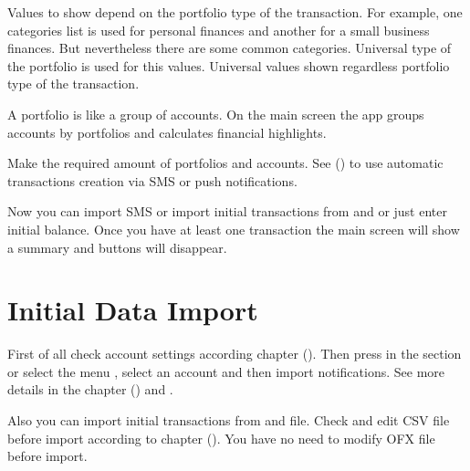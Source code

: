 \documentclass[a4paper,10pt,english]{sphinxmanual}
\begin{document}
Values to show depend on the portfolio type of the transaction.  For example,
one categories list is used for personal finances and another for a small business finances.
But nevertheless there are some common categories. Universal type of the portfolio is used
for this values. Universal values shown regardless portfolio type of the transaction.

A portfolio is like a group of accounts. On the main screen the app groups accounts by portfolios and
calculates financial highlights.

Make the required amount of portfolios and accounts. See {\hyperref[\detokenize{account-identities:chapter-account-identities}]{}} () to use automatic transactions creation
via SMS or push notifications.

Now you can import SMS or import initial transactions from  and  or just enter initial balance.
Once you have at least one transaction the main screen will show a summary and buttons will disappear.


\section{Initial Data Import}
\label{\detokenize{getting-started:initial-data-import}}
First of all check account settings according chapter {\hyperref[\detokenize{account-identities:chapter-account-identities}]{}} (). Then press 
in the  section or select the menu , select an account
and then import notifications. See more details in the chapter {\hyperref[\detokenize{import:chapter-import}]{}} () and .

Also you can import initial transactions from  and  file. Check and edit CSV file before import according to chapter {\hyperref[\detokenize{import:chapter-import}]{}} ().
You have no need to modify OFX file before import.
\end{document}
